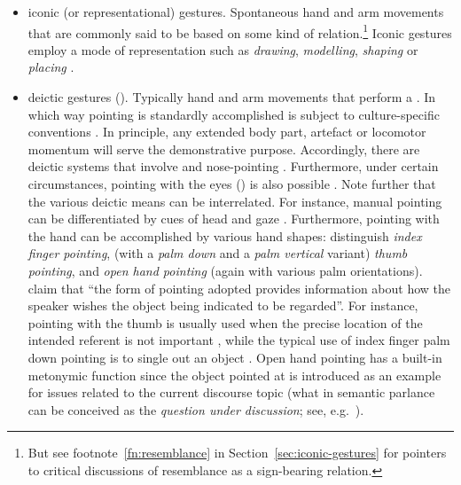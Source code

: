 \documentclass[output=paper,biblatex,babelshorthands,newtxmath,draftmode,colorlinks,citecolor=brown]{langscibook}
\begin{document}
\begin{itemize}
\item iconic (or representational) gestures. Spontaneous hand and arm movements that are commonly said to be based on some kind of  relation.\footnote{But see footnote~\ref{fn:resemblance} in Section~\ref{sec:iconic-gestures} for pointers to critical discussions of resemblance as a sign-bearing relation.} Iconic gestures employ a mode of representation such as \textit{drawing}, \textit{modelling}, \textit{shaping} or \textit{placing} \citep{Streeck:2008,Mueller:1998}.
\item deictic gestures (). Typically hand and arm movements that perform a . 
%
In which way pointing is standardly accomplished is subject to culture-specific conventions \citep{Wilkins:2003}. 
%
In principle, any extended body part, artefact or locomotor momentum will serve the demonstrative purpose. 
%
Accordingly, there are deictic systems that involve  \citep{Enfield:2001} and nose-pointing \citep{Cooperrider:Nunez:2012}. 
%
Furthermore, under certain circumstances, pointing with the eyes () is also possible \citep{Hadjikhani:Hoge:Snyder:de:Gelder:2008}. 
%
Note further that the various deictic means can be interrelated. For instance, manual pointing can be differentiated by cues of head and gaze \citep{Butterworth:Itakura:2000}.
%
Furthermore, pointing with the hand can be accomplished by various hand shapes: \citet{Kendon:Versante:2003} distinguish \emph{index finger pointing}, (with a \emph{palm down} and a \emph{palm vertical} variant) \emph{thumb pointing}, and \emph{open hand pointing} (again with various palm orientations).
%
\citet[]{Kendon:Versante:2003} claim that \enquote{the form of pointing adopted provides information about how the speaker wishes the object being indicated to be regarded}.
%
For instance, pointing with the thumb is usually used when the precise location of the intended referent is not important \citep[--125]{Kendon:Versante:2003}, while the typical use of index finger palm down pointing is to single out an object \citep[]{Kendon:Versante:2003}. 
%
Open hand pointing has a built-in metonymic function since the object pointed at is introduced as an example for issues related to the current discourse topic (what in semantic parlance can be conceived as the \emph{question under discussion}; see, e.g.\ \citealp{Ginzburg:2012}).

\end{itemize}
\end{document}
